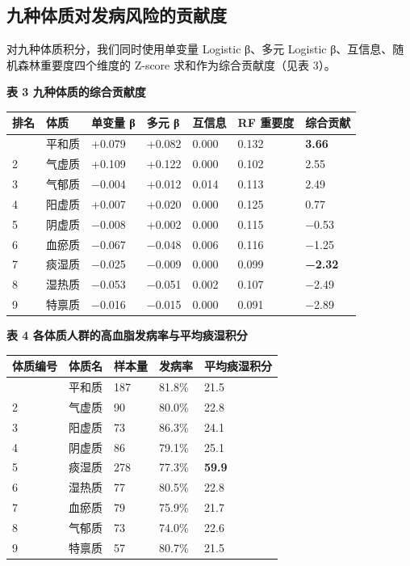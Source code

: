 \documentclass{MathorCupmodeling}
\begin{document}
\subsection{九种体质对发病风险的贡献度}\label{ux4e5dux79cdux4f53ux8d28ux5bf9ux53d1ux75c5ux98ceux9669ux7684ux8d21ux732eux5ea6}

对九种体质积分，我们同时使用单变量 Logistic β、多元 Logistic β、互信息、随机森林重要度四个维度的 Z-score 求和作为综合贡献度（见表 3）。

\textbf{表 3 九种体质的综合贡献度}

\begin{longtable}[]{@{}lllllll@{}}
\toprule\noalign{}
排名 & 体质 & 单变量 β & 多元 β & 互信息 & RF 重要度 & 综合贡献 \\
\midrule\noalign{}
\endhead
\bottomrule\noalign{}
\endlastfoot
1 & 平和质 & +0.079 & +0.082 & 0.000 & 0.132 & \textbf{3.66} \\
2 & 气虚质 & +0.109 & +0.122 & 0.000 & 0.102 & 2.55 \\
3 & 气郁质 & −0.004 & +0.012 & 0.014 & 0.113 & 2.49 \\
4 & 阳虚质 & +0.007 & +0.020 & 0.000 & 0.125 & 0.77 \\
5 & 阴虚质 & −0.008 & +0.002 & 0.000 & 0.115 & −0.53 \\
6 & 血瘀质 & −0.067 & −0.048 & 0.006 & 0.116 & −1.25 \\
7 & 痰湿质 & −0.025 & −0.009 & 0.000 & 0.099 & \textbf{−2.32} \\
8 & 湿热质 & −0.053 & −0.051 & 0.002 & 0.107 & −2.49 \\
9 & 特禀质 & −0.016 & −0.015 & 0.000 & 0.091 & −2.89 \\
\end{longtable}

\textbf{表 4 各体质人群的高血脂发病率与平均痰湿积分}

\begin{longtable}[]{@{}lllll@{}}
\toprule\noalign{}
体质编号 & 体质名 & 样本量 & 发病率 & 平均痰湿积分 \\
\midrule\noalign{}
\endhead
\bottomrule\noalign{}
\endlastfoot
1 & 平和质 & 187 & 81.8\% & 21.5 \\
2 & 气虚质 & 90 & 80.0\% & 22.8 \\
3 & 阳虚质 & 73 & 86.3\% & 24.1 \\
4 & 阴虚质 & 86 & 79.1\% & 25.1 \\
5 & 痰湿质 & 278 & 77.3\% & \textbf{59.9} \\
6 & 湿热质 & 77 & 80.5\% & 22.8 \\
7 & 血瘀质 & 79 & 75.9\% & 21.7 \\
8 & 气郁质 & 73 & 74.0\% & 22.6 \\
9 & 特禀质 & 57 & 80.7\% & 21.5 \\
\end{longtable}
\end{document}
